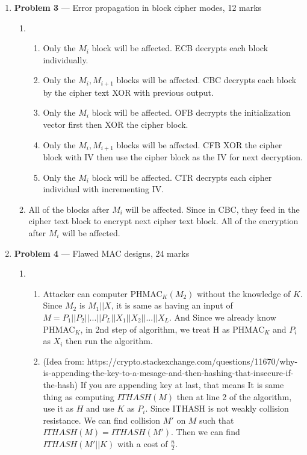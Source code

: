 \documentclass[11pt]{article}
\theoremstyle{definition}
\begin{document}
\begin{enumerate}
	\newpage
	\item[] \textbf{Problem 3} --- Error propagation in block cipher modes, 12 marks
	
	\begin{enumerate}
		\item %
		
		\begin{enumerate}
			\item %
			Only the $M_i$ block will be affected. ECB decrypts each block individually.
			\item %
			Only the $M_i,M_{i+1}$ blocks will be affected. CBC decrypts each block by the cipher text XOR with previous output.
			\item %
			Only the $M_i$ block will be affected. OFB decrypts the initialization vector first then XOR the cipher block.
			\item %
			Only the $M_i,M_{i+1}$ blocks will be affected. CFB XOR the cipher block with IV then use the cipher block as the IV for next decryption. 
			\item %
			Only the $M_i$ block will be affected. CTR decrypts each cipher individual with incrementing IV.
		
		\end{enumerate}
		
		\item %
			All of the blocks after $M_i$ will be affected. Since in CBC, they feed in the cipher text block to encrypt next cipher text block. All of the encryption after $M_i$ will be affected.
	
	\end{enumerate}
	
	\newpage
	\item[] \textbf{Problem 4} --- Flawed MAC designs, 24 marks
	
	\begin{enumerate}
	
		\item %
		
		\begin{enumerate}
			\item %
				Attacker can computer PHMAC$_K(M_2)$ without the knowledge of $K$. Since $M_2$ is $M_1||X$, it is same as having an input of $M = P_1||P_2||...||P_L||X_1||X_2||...||X_L$. And Since we already know PHMAC$_K$, in 2nd step of algorithm, we treat H as PHMAC$_K$ and $P_i$ as $X_i$ then run the algorithm.
			\item %
			(Idea from: https://crypto.stackexchange.com/questions/11670/why-is-appending-the-key-to-a-mesage-and-then-hashing-that-insecure-if-the-hash)\newline
			If you are appending key at last, that means It is same thing as computing $ITHASH(M)$ then at line 2 of the algorithm, use it as $H$ and use $K$ as $P_i$. Since ITHASH is not weakly collision resistance. We can find collision $M'$ on $M$ such that $ITHASH(M) = ITHASH(M')$. Then we can find $ITHASH(M'||K)$ with a cost of $\frac{n}{2}$.
		\end{enumerate}
		

\end{enumerate}
\end{enumerate}
\end{document}
